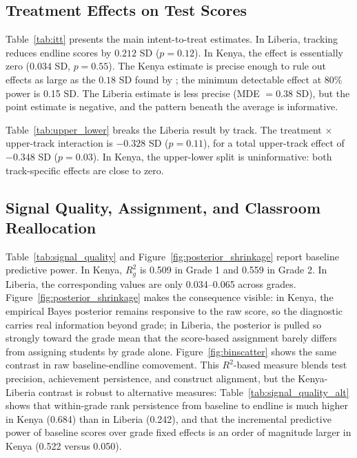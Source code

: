\documentclass[11pt]{article}
\begin{document}
\subsection{Treatment Effects on Test Scores}

Table~\ref{tab:itt} presents the main intent-to-treat estimates. In Liberia, tracking reduces endline scores by $0.212$ SD ($p = 0.12$). In Kenya, the effect is essentially zero ($0.034$ SD, $p = 0.55$). The Kenya estimate is precise enough to rule out effects as large as the $0.18$ SD found by \citet{duflo2011peer}; the minimum detectable effect at 80\% power is 0.15 SD. The Liberia estimate is less precise (MDE $= 0.38$ SD), but the point estimate is negative, and the pattern beneath the average is informative.

Table~\ref{tab:upper_lower} breaks the Liberia result by track. The treatment $\times$ upper-track interaction is $-0.328$ SD ($p = 0.11$), for a total upper-track effect of $-0.348$ SD ($p = 0.03$). In Kenya, the upper-lower split is uninformative: both track-specific effects are close to zero.

\subsection{Signal Quality, Assignment, and Classroom Reallocation}

Table~\ref{tab:signal_quality} and Figure~\ref{fig:posterior_shrinkage} report baseline predictive power. In Kenya, $R^2_g$ is 0.509 in Grade 1 and 0.559 in Grade 2. In Liberia, the corresponding values are only 0.034--0.065 across grades. Figure~\ref{fig:posterior_shrinkage} makes the consequence visible: in Kenya, the empirical Bayes posterior remains responsive to the raw score, so the diagnostic carries real information beyond grade; in Liberia, the posterior is pulled so strongly toward the grade mean that the score-based assignment barely differs from assigning students by grade alone. Figure~\ref{fig:binscatter} shows the same contrast in raw baseline-endline comovement. This $R^2$-based measure blends test precision, achievement persistence, and construct alignment, but the Kenya-Liberia contrast is robust to alternative measures: Table~\ref{tab:signal_quality_alt} shows that within-grade rank persistence from baseline to endline is much higher in Kenya (0.684) than in Liberia (0.242), and that the incremental predictive power of baseline scores over grade fixed effects is an order of magnitude larger in Kenya (0.522 versus 0.050).
\end{document}
